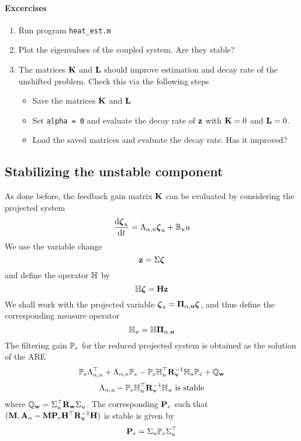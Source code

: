 \documentclass[12pt]{article}
\begin{document}
\paragraph{Excercises}

\begin{enumerate}

\item Run program {\tt heat\_est.m}

\item Plot the eigenvalues of the coupled system. Are they stable?

\item The matrices ${\mathbf K}$ and ${\mathbf L}$ should improve estimation and decay rate of the unshifted problem. Check this via the following steps
   \begin{itemize}
    \item Save the matrices ${\mathbf K}$ and ${\mathbf L}$
    
    \item Set {\tt alpha = 0} and evaluate the decay rate of ${\mathbf z}$ with ${\mathbf K} = 0$ and ${\mathbf L}=0$. 
    
    \item Load the saved matrices and evaluate the decay rate. Has it improved?
   \end{itemize}


\end{enumerate}

\subsection{Stabilizing the unstable component}
As done before, the feedback gain matrix ${\mathbf K}$ can be evaluated by considering the projected system
\[
 \frac{\textrm{d} \boldsymbol{\zeta}_u}{\textrm{d} t} = \Lambda_{\alpha,u} \boldsymbol{\zeta}_u + \mathbb{B}_u u
\]
We use the variable change
\[
 {\mathbf z} = \Sigma \boldsymbol{\zeta}
\]
and define the operator $\mathbb{H}$ by
\[
 \mathbb{H} \boldsymbol{\zeta} = {\mathbf H} {\mathbf z}
\]
We shall work with the projected variable $\boldsymbol{\zeta}_u = \mathbf{\Pi_{\alpha,u}} \boldsymbol{\zeta}$, and thus define the corresponding measure operator
\[
 \mathbb{H}_u = \mathbb{H} \mathbf{\Pi_{\alpha,u}}
\]
The filtering gain $\mathbb{P}_e$ for the reduced projected system is obtained as the solution of the ARE
\[
 \mathbb{P}_e \Lambda_{\alpha,u}^\top + \Lambda_{\alpha,u} \mathbb{P}_e - \mathbb{P}_e \mathbb{H}_u^\top {\mathbf R}_{\mathbf v}^{-1} \mathbb{H}_u \mathbb{P}_e + \mathbb{Q}_{\mathbf w}
\]
\[
 \Lambda_{\alpha,u} - \mathbb{P}_e \mathbb{H}_u^\top {\mathbf R}_{\mathbf v}^{-1} \mathbb{H}_u \text{ is stable} 
\]
where $\mathbb{Q}_{\mathbf w} = \Sigma_u^\top {\mathbf R}_{\mathbf w} \Sigma_u$. The corresponding ${\mathbf P}_e$ such that $({\mathbf M},{\mathbf A}_\alpha - {\mathbf M} {\mathbf P}_e {\mathbf H}^\top {\mathbf R}_{\mathbf v}^{-1} {\mathbf H})$ is stable is given by
\[
 {\mathbf P}_e = \Sigma_u \mathbb{P}_e \Sigma^\top_u
\]
\end{document}
